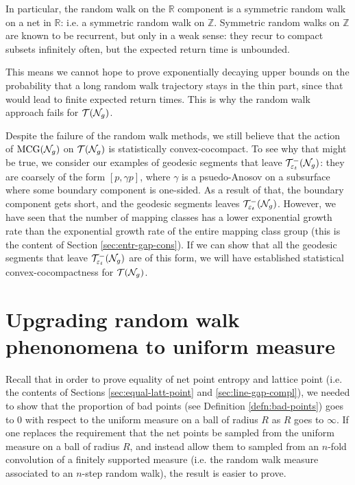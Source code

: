 In particular, the random walk on the $\mathbb{R}$ component is a symmetric random walk on a net in $\mathbb{R}$: i.e. a symmetric random walk on $\mathbb{Z}$.
Symmetric random walks on $\mathbb{Z}$ are known to be recurrent, but only in a weak sense: they recur to compact subsets infinitely often, but the expected return time is unbounded.

This means we cannot hope to prove exponentially decaying upper bounds on the probability that a long random walk trajectory stays in the thin part, since that would lead to finite expected return times.
This is why the random walk approach fails for $\mathcal{T}(\mathcal{N}_g)$.

Despite the failure of the random walk methods, we still believe that the action of $\mathrm{MCG}(\mathcal{N}_g)$ on $\mathcal{T}(\mathcal{N}_g)$ is statistically convex-cocompact.
To see why that might be true, we consider our examples of geodesic segments that leave $\mathcal{T}_{\varepsilon_t}^{-}(\mathcal{N}_g)$: they are coarsely of the form $[p, \gamma p]$, where $\gamma$ is a psuedo-Anosov on a subsurface where some boundary component is one-sided.
As a result of that, the boundary component gets short, and the geodesic segments leaves $\mathcal{T}_{\varepsilon_t}^{-}(\mathcal{N}_g)$.
However, we have seen that the number of mapping classes has a lower exponential growth rate than the exponential growth rate of the entire mapping class group (this is the content of Section \ref{sec:entr-gap-cons}).
If we can show that all the geodesic segments that leave $\mathcal{T}_{\varepsilon_t}^{-}(\mathcal{N}_g)$ are of this form, we will have established statistical convex-cocompactness for $\mathcal{T}(\mathcal{N}_g)$.

\section{Upgrading random walk phenonomena to uniform measure}
\label{sec:upgr-rand-walk}

Recall that in order to prove equality of net point entropy and lattice point (i.e. the contents of Sections \ref{sec:equal-latt-point} and \ref{sec:line-gap-compl}), we needed to show that the proportion of bad points (see Definition \ref{defn:bad-points}) goes to $0$ with respect to the uniform measure on a ball of radius $R$ as $R$ goes to $\infty$.
If one replaces the requirement that the net points be sampled from the uniform measure on a ball of radius $R$, and instead allow them to sampled from an $n$-fold convolution of a finitely supported measure (i.e. the random walk measure associated to an $n$-step random walk), the result is easier to prove.

